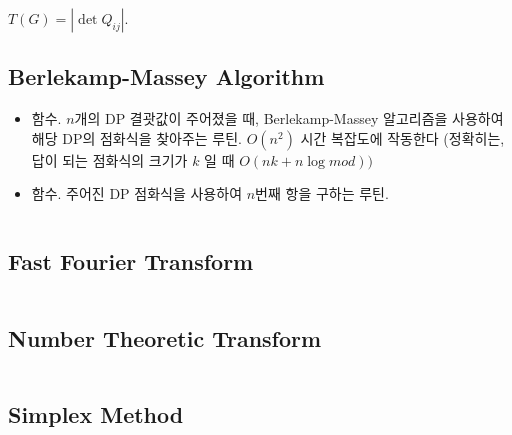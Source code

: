 $T(G) = |\det Q_{ij}|$.

\subsection{Berlekamp-Massey Algorithm}
\begin{itemize}
    \item {} 함수. $n$개의 DP 결괏값이 주어졌을 때, Berlekamp-Massey 알고리즘을 사용하여 해당 DP의 점화식을 찾아주는 루틴. $O(n^2)$ 시간 복잡도에 작동한다 (정확히는, 답이 되는 점화식의 크기가 $k$ 일 때 $O(nk+n\log mod))$
    \item {} 함수. 주어진 DP 점화식을 사용하여 $n$번째 항을 구하는 루틴.
\end{itemize}
\inputminted{cpp}{src/Math/berlekamp.cpp}
\fi


\subsection{Fast Fourier Transform}
\inputminted{cpp}{src/Math/fft.cpp} %

\subsection{Number Theoretic Transform}
\inputminted{cpp}{src/Math/ntt.cpp} %

\subsection{Simplex Method}
\inputminted{cpp}{src/Math/simplex.cpp}

